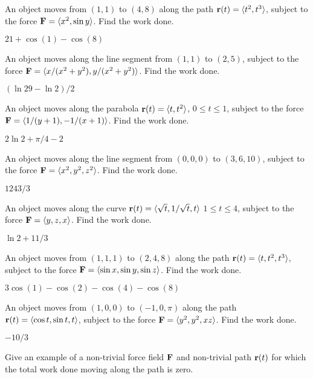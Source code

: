 \begin{enumialphparenastyle}
\begin{ex}
An object moves from $(1,1)$ to
$(4,8)$ along the path ${\bf r}(t)=\langle t^2,t^3\rangle$,
subject to the force ${\bf F}=\langle x^2,\sin y\rangle$. Find the work
done. 
\begin{sol}
	$21+\cos(1)-\cos(8)$
\end{sol}
\end{ex}

\begin{ex}
An object moves along the line segment from $(1,1)$ to $(2,5)$,
subject to the force ${\bf F}=\langle
x/(x^2+y^2),y/(x^2+y^2)\rangle$. Find the work done.
\begin{sol}
	$(\ln29-\ln2)/2$
\end{sol}
\end{ex}

\begin{ex}
An object moves along the parabola ${\bf r}(t)=\langle
t,t^2\rangle$, $0\le t\le1$, subject to the force ${\bf F}=\langle
1/(y+1),-1/(x+1)\rangle$. Find the work done.
\begin{sol}
	$2\ln2+\pi/4-2$
\end{sol}
\end{ex}

\begin{ex}
An object moves along the line segment from $(0,0,0)$ to
$(3,6,10)$,
subject to the force ${\bf F}=\langle x^2,y^2,z^2\rangle$. 
Find the work
done. 
\begin{sol}
	$1243/3$
\end{sol}
\end{ex}

\begin{ex}
An object moves along the curve ${\bf r}(t)=\langle
\sqrt{t},1/\sqrt{t},t\rangle$ $1\le t\le4$, subject to the force ${\bf
  F}=\langle y,z,x\rangle$.  Find the work done.
\begin{sol}
	$\ln2+11/3$
\end{sol}
\end{ex}

\begin{ex}
An object moves from $(1,1,1)$ to
$(2,4,8)$ along the path ${\bf r}(t)=\langle t,t^2,t^3\rangle$,
subject to the force ${\bf F}=\langle \sin x,\sin y,\sin z\rangle$. 
Find the work
done. 
\begin{sol}
	$3\cos(1)-\cos(2)-\cos(4)-\cos(8)$
\end{sol}
\end{ex}

\begin{ex}
An object moves from $(1,0,0)$ to
$(-1,0,\pi)$ along the path ${\bf r}(t)=\langle \cos t,\sin t, t\rangle$,
subject to the force ${\bf F}=\langle y^2,y^2,xz\rangle$. 
Find the work
done. 
\begin{sol}
	$-10/3$
\end{sol}
\end{ex}

\begin{ex}
Give an example of a non-trivial force field ${\bf F}$ and
non-trivial path ${\bf r}(t)$ for which the total work done moving along
the path is zero.
\end{ex}

\end{enumialphparenastyle}